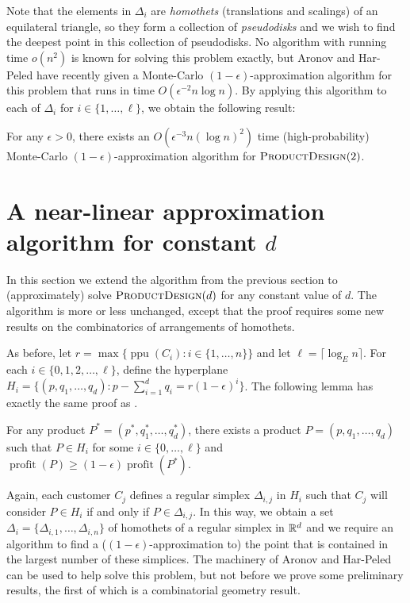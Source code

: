 \documentclass[lotsofwhite]{patmorin}
\newcommand{\ppu}{\operatorname{ppu}}
\newcommand{\val}{\operatorname{profit}}
\newcommand{\eps}{\epsilon}
\begin{document}
Note that the elements in $\Delta_i$ are \emph{homothets} (translations and
scalings) of an equilateral triangle, so they form a collection of
\emph{pseudodisks} and we wish to find the deepest point in this collection
of pseudodisks.  No algorithm with running time $o(n^2)$ is known for
solving this problem exactly, but Aronov and Har-Peled \cite{ah08} have
recently given a Monte-Carlo $(1-\eps)$-approximation algorithm for this
problem that runs in time $O(\eps^{-2}n\log n)$.  By applying this
algorithm to each of $\Delta_i$ for $i\in\{1,\ldots,\ell\}$, we obtain the
following result:

\begin{thm}
  For any $\eps >0$, there exists an $O(\eps^{-3}n(\log n)^2)$ time
  (high-probability) Monte-Carlo $(1-\eps)$-approximation algorithm for
  $\textsc{ProductDesign}(2)$.
\end{thm}

\section{A near-linear approximation algorithm for constant $d$}

In this section we extend the algorithm from the previous section to
(approximately) solve $\textsc{ProductDesign}(d)$ for any constant value of
$d$.  The algorithm is more or less unchanged, except that the proof
requires some new results on the combinatorics of arrangements of
homothets.

As before, let $r=\max\{\ppu(C_i) : i\in\{1,\ldots, n\}\}$ and let
$\ell = \lceil\log_E n\rceil$. For each $i\in\{0,1,2,\ldots,\ell\}$,
define the hyperplane $H_i = \{ (p,q_1,\ldots,q_d) : p-\sum_{i=1}^d
q_i =  r(1-\eps)^i \}$.  The following lemma has exactly the same proof
as .

\begin{lem}
  For any product $P^*=(p^*,q_1^*,\ldots,q_d^*)$, there exists
  a product $P=(p,q_1,\ldots,q_d)$ such that $P\in H_i$ for some
  $i\in\{0,\ldots,\ell\}$ and $\val(P) \ge (1-\eps)\val(P^*)$.
\end{lem}

Again, each customer $C_j$ defines a regular simplex $\Delta_{i,j}$
in $H_{i}$ such that $C_j$ will consider $P\in H_i$ if and
only if $P\in\Delta_{i,j}$.  In this way, we obtain a set
$\Delta_i=\{\Delta_{i,1},\ldots,\Delta_{i,n}\}$ of homothets of
a regular simplex in $\mathbb{R}^d$ and we require an algorithm to find a
($(1-\eps)$-approximation to) the point that is contained in the largest
number of these simplices.  The machinery of Aronov and Har-Peled
\cite{ah08} can be used to help solve this problem, but not before we
prove some preliminary results, the first of which is a combinatorial
geometry result.
\end{document}

